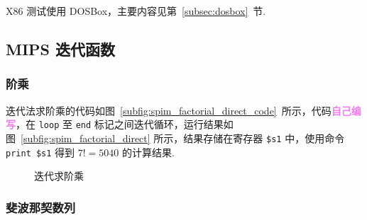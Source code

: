 \documentclass[11pt]{SEU-Digital-Report}
\begin{document}
      X86 测试使用 DOSBox，主要内容见第~\ref{subsec:dosbox}~节.

    \subsection{MIPS 迭代函数}

      \subsubsection{阶乘}

        迭代法求阶乘的代码如图~\ref{subfig:spim_factorial_direct_code}~所示，代码\textcolor{violet}{\textbf{自己编写}}，在 \texttt{loop} 至 \texttt{end} 标记之间迭代循环，运行结果如图~\ref{subfig:spim_factorial_direct} 所示，结果存储在寄存器 \texttt{\$s1} 中，使用命令 \texttt{print \$s1} 得到 $7!=5040$ 的计算结果.

        \begin{figure}[htbp]
          \centering
          \caption{迭代求阶乘}
          \label{fig:spim_factorial_direct}
        \end{figure}

      \subsubsection{斐波那契数列}
\end{document}
